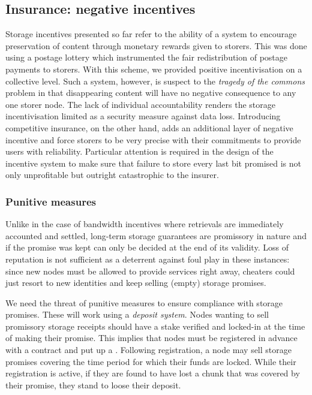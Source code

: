 




\subsection{Insurance: negative incentives}\label{sec:chunk-insurance}

Storage incentives presented so far refer to the ability of a system to encourage preservation of content through monetary rewards given to storers. This was done using a postage lottery which instrumented the fair redistribution of postage payments to storers. With this scheme, we provided positive incentivisation on a collective level. Such a system,  however, is suspect to the \emph{tragedy of the commons} problem in that disappearing content will have no negative consequence to any one storer node. The lack of individual accountability renders the storage incentivisation limited as a security measure against data loss. Introducing competitive insurance, on the other hand, adds an additional layer of negative incentive and force storers to be very precise with their commitments to provide users with reliability. Particular attention is required in the design of the incentive system to make sure that failure to store every last bit promised is not only unprofitable but outright catastrophic to the insurer. 

\subsubsection{Punitive measures}

Unlike in the case of bandwidth incentives where retrievals are immediately accounted and settled, long-term storage guarantees are promissory in nature and if the promise was kept can only be decided at the end of its validity. Loss of reputation is not sufficient as a deterrent against foul play in these instances: since new nodes must be allowed to provide services right away, cheaters could just resort to new identities and keep selling (empty) storage promises.

We need the threat of punitive measures to ensure compliance with storage promises. These will work using a \emph{deposit system}. Nodes wanting to sell promissory storage receipts should have a stake verified and locked-in at the time of making their promise. This implies  that nodes must be registered in advance with a contract and put up a . Following registration, a node may sell storage promises covering the time period for which their funds are locked. While their registration is active, if they are found to have lost a chunk that was covered by their promise, they stand to loose their deposit.

